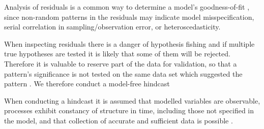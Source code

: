 
Analysis of residuals is a common way to determine a model’s goodness-of-fit \citep{Cox1968general}, since  non-random patterns in the residuals may indicate model misspecification, serial correlation in sampling/observation error, or heteroscedasticity. 

When inspecting residuals there is a danger of hypothesis fishing and if multiple true hypotheses are tested it is likely that some of them will be rejected. Therefore it is valuable to reserve part of the data for validation, so that a pattern’s significance is not tested on the same data set which suggested the pattern \citep{thygesen2017validation}. We therefore conduct a model-free hindcast

When conducting a hindcast it is assumed that modelled variables are observable, processes exhibit constancy of structure in time, including those not specified in the model, and that collection of accurate and sufficient data is possible \citep{hodges1992you}.



